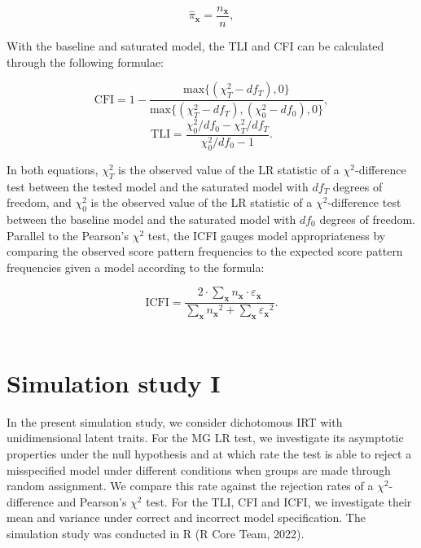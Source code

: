 \documentclass[Royal,sageapa,times,doublespace]{sagej}
\begin{document}
\begin{equation*}
\hat{\pi}_{\boldsymbol{x}} = \frac{n_{\boldsymbol{x}}}{n},
\end{equation*}

With the baseline and saturated model, the TLI and CFI can be calculated through the following formulae:

\begin{equation}
\text{CFI} = 1 - \frac{\text{max}\{(\chi^2_T - df_T), 0\}}{\text{max}\{(\chi^2_T - df_T), (\chi^2_0 - df_0), 0\}},
\end{equation}
\begin{equation}
\text{TLI} = \frac{\chi^2_0/df_0 - \chi^2_T/df_T}{\chi^2_0/df_0 - 1}.
\end{equation}

In both equations, $\chi^{2}_{T}$ is the observed value of the LR statistic of a $\chi^2$-difference test between the tested model and the saturated model with $df_T$ degrees of freedom, and $\chi^{2}_{0}$ is the observed value of the LR statistic of a $\chi^2$-difference test between the baseline model and the saturated model with $df_0$ degrees of freedom. \\
\indent Parallel to the Pearson's $\chi^2$ test, the ICFI gauges model appropriateness by comparing the observed score pattern frequencies to the expected score pattern frequencies given a model according to the formula:

\begin{equation}
\text{ICFI} = \frac{2 \cdot \sum_{\boldsymbol{x}}  n_{\boldsymbol{x}} \cdot \varepsilon_{\boldsymbol{x}}  }{  \sum_{\boldsymbol{x}}  {n_{\boldsymbol{x}}}^2 +  \sum_{\boldsymbol{x}}  {\varepsilon_{\boldsymbol{x}}} ^2 }.
\end{equation} \\

\section{\centering Simulation study I}
In the present simulation study, we consider dichotomous IRT with unidimensional latent traits. For the MG LR test, we investigate its asymptotic properties under the null hypothesis and at which rate the test is able to reject a misspecified model under different conditions when groups are made through random assignment. We compare this rate against the rejection rates of a $\chi^2$-difference and Pearson's $\chi^2$ test. For the TLI, CFI and ICFI, we investigate their mean and variance under correct and incorrect model specification. The simulation study was conducted in R (R Core Team, 2022).
\end{document}
